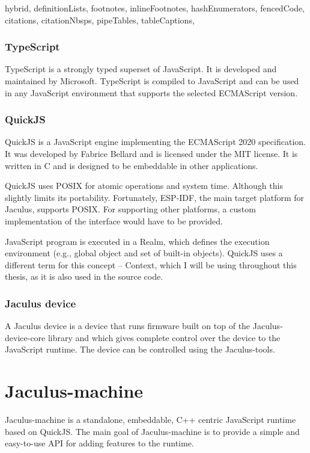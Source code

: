 \documentclass[
  digital,
  oneside,
  nosansbold,
  nocolorbold,
  lof,
  lot
]{fithesis4}
\begin{document}
\begin{markdown*}{%
  hybrid,
  definitionLists,
  footnotes,
  inlineFootnotes,
  hashEnumerators,
  fencedCode,
  citations,
  citationNbsps,
  pipeTables,
  tableCaptions,
}
\subsection{TypeScript}

TypeScript is a strongly typed superset of JavaScript. It is developed and maintained by Microsoft. TypeScript is compiled to JavaScript and can be used in any JavaScript environment that supports the selected ECMAScript version.


\subsection{QuickJS}

QuickJS is a JavaScript engine implementing the ECMAScript 2020 specification. It was developed by Fabrice Bellard and is licensed under the MIT license. It is written in C and is designed to be embeddable in other applications.

QuickJS uses POSIX for atomic operations and system time. Although this slightly limits its portability. Fortunately, ESP-IDF, the main target platform for Jaculus, supports POSIX. For supporting other platforms, a custom implementation of the interface would have to be provided.

JavaScript program is executed in a Realm, which defines the execution environment (e.g., global object and set of built-in objects). QuickJS uses a different term for this concept -- Context, which I will be using throughout this thesis, as it is also used in the source code.


\subsection{Jaculus device}

A Jaculus device is a device that runs firmware built on top of the Jaculus-device-core library and which gives complete control over the device to the JavaScript runtime. The device can be controlled using the Jaculus-tools.


\chapter{Jaculus-machine}

Jaculus-machine is a standalone, embeddable, C++ centric JavaScript runtime based on QuickJS. The main goal of Jaculus-machine is to provide a simple and easy-to-use API for adding features to the runtime.


\end{markdown*}
\end{document}
